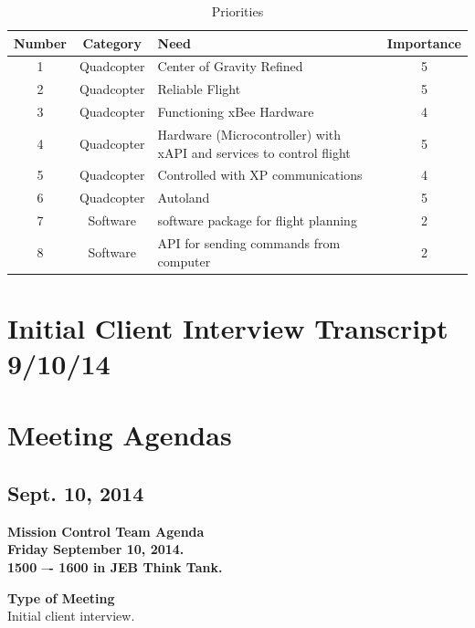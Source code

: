 \documentclass[pdftex,11pt]{article}
\begin{document}
\begin{table}[h]
	\centering
	\begin{tabular}{c | c | p{8cm} | c}
	\hline
		 Number & Category & Need & Importance \\ \hline
		 1 & Quadcopter & Center of Gravity Refined & 5 \\
		 2 & Quadcopter & Reliable Flight & 5 \\
		 3 & Quadcopter & Functioning xBee Hardware &  4 \\
		 4 & Quadcopter & Hardware (Microcontroller) with xAPI and services to control flight & 5 \\
		 5 & Quadcopter & Controlled with XP communications &  4 \\
	   6 & Quadcopter & Autoland & 5 \\
	   7 & Software & software package for flight planning & 2\\
	   8 & Software & API for sending commands from computer & 2\\
	\end{tabular}
	\caption{Priorities}
	\label{table:2}
\end{table}

\clearpage
\section{Initial Client Interview Transcript 9/10/14}
\label{sec:clienttranscript}

\clearpage


\section{Meeting Agendas}

\subsection{Sept. 10, 2014}
{ \huge \bfseries Mission Control Team Agenda \\[0.4cm] }
{ \huge \bfseries Friday September  10, 2014.\\1500 –-  1600  in JEB   Think  Tank. \\[0.4cm] }
\vspace*{2.5mm}

{ \large \bfseries \hspace*{2 mm} Type of Meeting\\}
\hspace*{12 mm} Initial client interview.
\vspace*{1.5mm}
\end{document}
